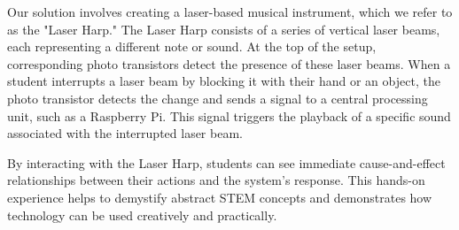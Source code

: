 Our solution involves creating a laser-based musical instrument, which we refer to as the "Laser Harp." The Laser Harp consists of a series of vertical laser beams, each representing a different note or sound. At the top of the setup, corresponding photo transistors detect the presence of these laser beams. When a student interrupts a laser beam by blocking it with their hand or an object, the photo transistor detects the change and sends a signal to a central processing unit, such as a Raspberry Pi. This signal triggers the playback of a specific sound associated with the interrupted laser beam.

By interacting with the Laser Harp, students can see immediate cause-and-effect relationships between their actions and the system's response. This hands-on experience helps to demystify abstract STEM concepts and demonstrates how technology can be used creatively and practically.
